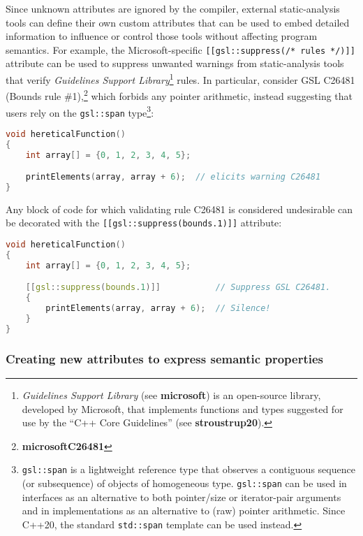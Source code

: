 Since unknown attributes are ignored by the compiler, external
static-analysis tools can define their own custom attributes that can be
used to embed detailed information to influence or control those tools
without affecting program semantics. For example, the Microsoft-specific
\texttt{[[gsl::suppress(/*}~\texttt{rules}~\texttt{*/)]]} attribute can
be used to suppress unwanted warnings from static-analysis tools that
verify \emph{Guidelines Support Library}{\cprotect\footnote{\emph{Guidelines
Support Library} (see \textbf{microsoft}) is an open-source library, developed by Microsoft,
that implements functions and types suggested for use by the ``C++
  Core Guidelines'' (see \textbf{{stroustrup20}}).}}
rules. In particular, consider GSL C26481 (Bounds rule \#1),\footnote{\textbf{microsoftC26481}} which forbids any pointer arithmetic, instead
suggesting that users rely on the \texttt{gsl::span}
type{\cprotect\footnote{\texttt{gsl::span} is a lightweight reference
type that observes a contiguous sequence (or subsequence) of objects
of homogeneous type. \texttt{gsl::span} can be used in interfaces as
an alternative to both pointer/size or iterator-pair arguments and in
implementations as an alternative to (raw) pointer arithmetic. Since
  C++20, the standard \texttt{std::span} template can be used instead.}}:

\begin{lstlisting}[language=C++]
void hereticalFunction()
{
    int array[] = {0, 1, 2, 3, 4, 5};

    printElements(array, array + 6);  // elicits warning C26481
}
\end{lstlisting}

\noindent Any block of code for which validating rule C26481 is considered
undesirable can be decorated with the
\texttt{[[gsl::suppress(bounds.1)]]} attribute:

\begin{lstlisting}[language=C++]
void hereticalFunction()
{
    int array[] = {0, 1, 2, 3, 4, 5};

    [[gsl::suppress(bounds.1)]]           // Suppress GSL C26481.
    {
        printElements(array, array + 6);  // Silence!
    }
}
\end{lstlisting}


\subsubsection[Creating new attributes to express semantic properties]{Creating new attributes to express semantic properties}\label{creating-new-attributes-to-express-semantic-properties}

